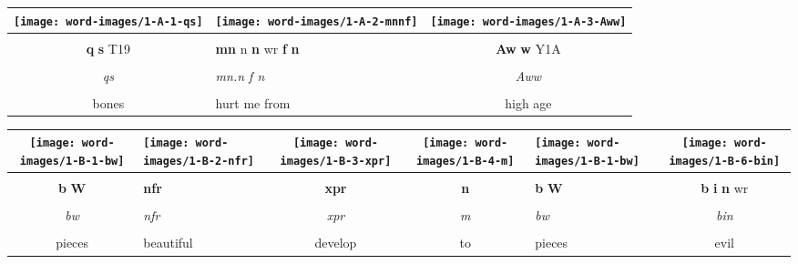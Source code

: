 \vspace{7.5mm}

\begin{tabularx}{\linewidth}{cYc}
	\texttt{[image: word-images/1-A-1-qs]} &
	\texttt{[image: word-images/1-A-2-mnnf]} &
	\texttt{[image: word-images/1-A-3-Aww]} \\
	\hline \\ 
	\textbf{q} \textbf{s} T19 &
	\textbf{mn} n \textbf{n} wr \textbf{f} \textbf{n} &
	\textbf{Aw} \textbf{w} Y1A \\
	\hline \\ 
	\textit{qs} & \textit{mn.n f n} & \textit{Aww} \\
	\hline \\ 
	bones & hurt me from & high age
\end{tabularx}

\vspace{7.5mm}

\begin{tabularx}{\linewidth}{cYccYc}
	\texttt{[image: word-images/1-B-1-bw]} &
	\texttt{[image: word-images/1-B-2-nfr]} &
	\texttt{[image: word-images/1-B-3-xpr]} &
	\texttt{[image: word-images/1-B-4-m]} &
	\texttt{[image: word-images/1-B-1-bw]} &
	\texttt{[image: word-images/1-B-6-bin]} \\
	\hline \\ 
	\textbf{b} \textbf{W} &
	\textbf{nfr} &
	\textbf{xpr} &
	\textbf{n} &
	\textbf{b} \textbf{W} &
	\textbf{b} \textbf{i} \textbf{n} wr \\
	\hline \\ 
	\textit{bw} & \textit{nfr} & \textit{xpr} & \textit{m} & \textit{bw} & \textit{bin} \\
	\hline \\ 
	pieces & beautiful & develop & to & pieces & evil
\end{tabularx}

\vspace*{\fill}
